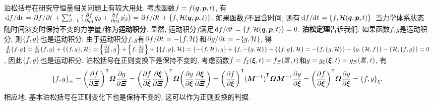 泊松括号在研究守恒量相关问题上有较大用处. 考虑函数$ f=f(\vb*{q},\vb*{p},t) $, 有$ \dv*{f}{t} = \pdv*{f}{t}+\sum_{\beta=1}^s \big(\pdv{f}{q_{\beta}}\dot{q_{\beta}}+\pdv{f}{p_{\beta}}\dot{p_{\beta}}\big) = \pdv*{f}{t}+\pb{f}{\hami(\vb*{q},\vb*{p},t)} $. 如果函数$ f $不显含时间, 则有$ \dv*{f}{t} = \pb{f}{\hami(\vb*{q},\vb*{p},t)} $. 当力学体系状态随时间演变时保持不变的力学量$ f $称为\textbf{运动积分}. 显然, 运动积分$ f $满足$ \dv*{f}{t}=\pb{f}{\hami(\vb*{q},\vb*{p},t)}=0 $. \textbf{泊松定理}告诉我们: 如果函数$ f,g $是运动积分, 则$ \pb{f}{g} $也是运动积分. 由于运动积分$ f,g $有$ \pdv*{f}{t}=-\pb{f}{\hami} $和$ \pdv*{g}{t}=-\pb{g}{\hami} $, 得$ \dv{t} \pb{f}{g} = \pdv{t} \pb{f}{g}+\pb{\pb{f}{g}}{\hami} = \pb{\pdv{f}{t}}{g}+\pb{f}{\pdv{g}{t}}+\pb{\pb{f}{g}}{\hami} = \pb{-\pb{f}{\hami}}{g}+\pb{f}{-\pb{g}{\hami}}+\pb{\pb{f}{g}}{\hami} = -\pb{f}{\pb{g}{\hami}}-\pb{g}{\pb{\hami}{f}}-\pb{\hami}{\pb{f}{g}} = 0 $, 因此$ \pb{f}{g} $也是运动积分. 泊松括号在正则变换下是保持不变的, 考虑函数$ f=f_{\xi}(\vb*{\xi},t)=f_{\varXi}(\vb*{\varXi},t) $和$ g=g_{\xi}(\vb*{\xi},t)=g_{\varXi}(\vb*{\varXi},t) $, 有
\begin{equation*}
    \pb{f}{g}_{\varXi} = \transpose{\bigg(\pdv{f}{\vb*{\varXi}}\bigg)} \vb*{\varOmega} \pdv{g}{\vb*{\varXi}} = \transpose{\bigg(\pdv{f}{\vb*{\xi}}\pdv{\vb*{\xi}}{\vb*{\varXi}}\bigg)} \vb*{\varOmega} \bigg(\pdv{g}{\vb*{\xi}}\pdv{\vb*{\xi}}{\vb*{\varXi}}\bigg) = \transpose{\bigg(\pdv{f}{\vb*{\xi}}\bigg)} \transpose{(\vb*{M}^{-1})} \vb*{\varOmega}\vb*{M}^{-1} \pdv{g}{\vb*{\xi}} = \transpose{\bigg(\pdv{f}{\vb*{\xi}}\bigg)} \vb*{\varOmega} \pdv{g}{\vb*{\xi}} = \pb{f}{g}_{\xi}.
\end{equation*}
相应地, 基本泊松括号在正则变化下也是保持不变的, 这可以作为正则变换的判据.

